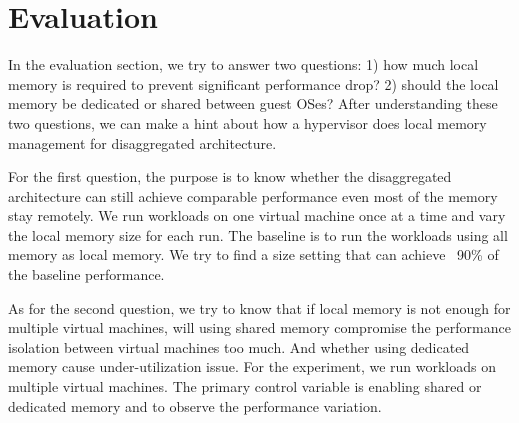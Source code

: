 \documentclass[twocolumn]{article}
\begin{document}
\section{Evaluation}
In the evaluation section, we try to answer two questions: 1) how much local memory is required to prevent significant performance drop? 2) should the local memory be dedicated or shared between guest OSes? After understanding these two questions, we can make a hint about how a hypervisor does local memory management for disaggregated architecture.

For the first question, the purpose is to know whether the disaggregated architecture can still achieve comparable performance even most of the memory stay remotely. We run workloads on one virtual machine once at a time and vary the local memory size for each run. The baseline is to run the workloads using all memory as local memory. We try to find a size setting that can achieve ~90\% of the baseline performance.

As for the second question, we try to know that if local memory is not enough for multiple virtual machines, will using shared memory compromise the performance isolation between virtual machines too much. And whether using dedicated memory cause under-utilization issue. For the experiment, we run workloads on multiple virtual machines. The primary control variable is enabling shared or dedicated memory and to observe the performance variation.

{}

\end{document}
